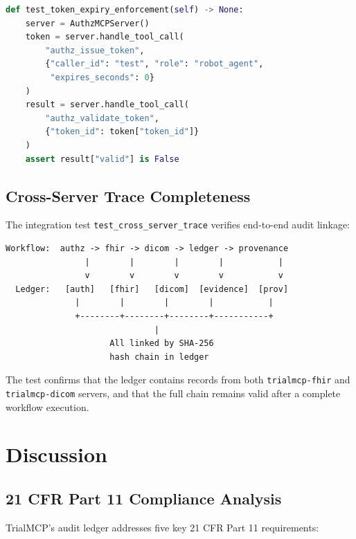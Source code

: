 \documentclass[10pt,letterpaper]{article}
\begin{document}
\begin{lstlisting}[language=Python,title={\textbf{Token Expiry Test (v0.2.0)}}]
def test_token_expiry_enforcement(self) -> None:
    server = AuthzMCPServer()
    token = server.handle_tool_call(
        "authz_issue_token",
        {"caller_id": "test", "role": "robot_agent",
         "expires_seconds": 0}
    )
    result = server.handle_tool_call(
        "authz_validate_token",
        {"token_id": token["token_id"]}
    )
    assert result["valid"] is False
\end{lstlisting}

\subsection{Cross-Server Trace Completeness}

The integration test \texttt{test\_cross\_server\_trace} verifies end-to-end audit linkage:

\begin{lstlisting}[title={\textbf{Cross-Server Audit Trace Verification}}]
  Workflow:  authz -> fhir -> dicom -> ledger -> provenance
                |        |        |        |           |
                v        v        v        v           v
  Ledger:   [auth]   [fhir]   [dicom]  [evidence]  [prov]
              |        |        |        |           |
              +--------+--------+--------+-----------+
                              |
                     All linked by SHA-256
                     hash chain in ledger
\end{lstlisting}

The test confirms that the ledger contains records from both \texttt{trialmcp-fhir} and \texttt{trialmcp-dicom} servers, and that the full chain remains valid after a complete workflow execution.

\section{Discussion}

\subsection{21 CFR Part 11 Compliance Analysis}

TrialMCP's audit ledger addresses five key 21 CFR Part 11 requirements:
\end{document}
